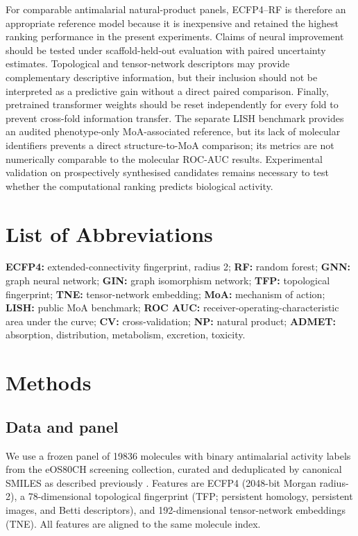 \documentclass[11pt,a4paper]{article}
\begin{document}
For comparable antimalarial natural-product panels, ECFP4--RF is therefore an appropriate reference model because it is inexpensive and retained the highest ranking performance in the present experiments. Claims of neural improvement should be tested under scaffold-held-out evaluation with paired uncertainty estimates. Topological and tensor-network descriptors may provide complementary descriptive information, but their inclusion should not be interpreted as a predictive gain without a direct paired comparison. Finally, pretrained transformer weights should be reset independently for every fold to prevent cross-fold information transfer. The separate LISH benchmark provides an audited phenotype-only MoA-associated reference, but its lack of molecular identifiers prevents a direct structure-to-MoA comparison; its metrics are not numerically comparable to the molecular ROC-AUC results. Experimental validation on prospectively synthesised candidates remains necessary to test whether the computational ranking predicts biological activity.

\section{List of Abbreviations}

\textbf{ECFP4:} extended-connectivity fingerprint, radius \num{2}; \textbf{RF:} random forest; \textbf{GNN:} graph neural network; \textbf{GIN:} graph isomorphism network; \textbf{TFP:} topological fingerprint; \textbf{TNE:} tensor-network embedding; \textbf{MoA:} mechanism of action; \textbf{LISH:} public MoA benchmark; \textbf{ROC AUC:} receiver-operating-characteristic area under the curve; \textbf{CV:} cross-validation; \textbf{NP:} natural product; \textbf{ADMET:} absorption, distribution, metabolism, excretion, toxicity.

\section{Methods}

\subsection{Data and panel}

We use a frozen panel of \num{19836} molecules with binary antimalarial activity labels from the eOS80CH screening collection, curated and deduplicated by canonical SMILES as described previously \citep{temgoua2026antimalarial}. Features are ECFP4 (\num{2048}-bit Morgan radius-\num{2}), a \num{78}-dimensional topological fingerprint (TFP; persistent homology, persistent images, and Betti descriptors), and \num{192}-dimensional tensor-network embeddings (TNE). All features are aligned to the same molecule index.
\end{document}
